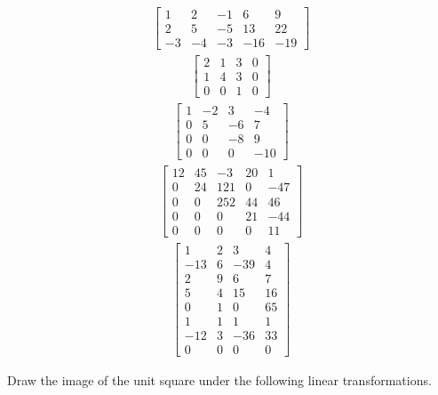\begin{tasks}[resume, style=enumerate]
\begin{align*}
    \begin{bmatrix}
      1 & 2 & -1 & 6 & 9 \\
      2 & 5 & -5 & 13 & 22 \\
      -3 & -4 & -3 & -16 & -19
    \end{bmatrix}
  \end{align*}
\task
  \begin{align*}
    \begin{bmatrix}
      2 & 1 & 3 & 0 \\
      1 & 4 & 3 & 0 \\
      0 & 0 & 1 & 0
    \end{bmatrix}
  \end{align*}
\task
  \begin{align*}
    \begin{bmatrix}
      1 & -2 & 3 & -4 \\
      0 & 5 & -6 &  7 \\
      0 & 0 & -8 & 9 \\
      0 & 0 & 0 & -10
    \end{bmatrix}
  \end{align*}
\task
  \begin{align*}
    \begin{bmatrix}
      12 & 45 & -3 & 20 & 1 \\
      0 & 24 & 121 & 0 & -47 \\
      0 & 0 & 252 & 44 & 46 \\
      0 & 0 & 0 & 21 & -44 \\
      0 & 0 & 0 & 0 & 11
    \end{bmatrix}
  \end{align*}
\task
  \begin{align*}
    \begin{bmatrix}
      1 & 2 & 3 & 4 \\
      -13 & 6 & -39 & 4 \\
      2 & 9 & 6 & 7 \\
      5 & 4  & 15 & 16 \\
      0 & 1 & 0 & 65 \\
      1 & 1 & 1 & 1 \\
      -12 & 3 & -36 & 33 \\
      0 & 0 & 0 & 0
    \end{bmatrix}
  \end{align*}
\end{tasks}
Draw the image of the unit square under the following linear
transformations.
